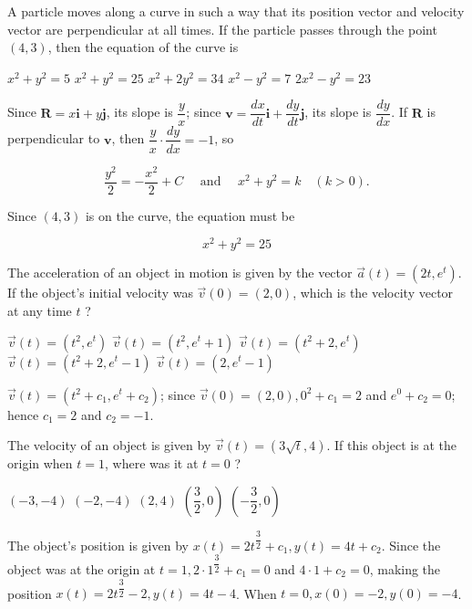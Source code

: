 \question
A particle moves along a curve in such a way that its position vector and velocity vector are perpendicular at all times. If the particle passes through the point $(4,3)$, then the equation of the curve is
\begin{choices}
  \choice $x^{2}+y^{2}=5$
  \CorrectChoice $x^{2}+y^{2}=25$
  \choice $x^{2}+2 y^{2}=34$
  \choice $x^{2}-y^{2}=7$
  \choice $2 x^{2}-y^{2}=23$
\end{choices}
\begin{solution}
Since $\mathbf{R}=x \mathbf{i}+y \mathbf{j}$, its slope is $\dfrac{y}{x}$; since $\mathbf{v}=\dfrac{d x}{d t} \mathbf{i}+\dfrac{d y}{d t} \mathbf{j}$, its slope is $\dfrac{d y}{d x}$. If $\mathbf{R}$ is perpendicular to $\mathbf{v}$, then $\dfrac{y}{x} \cdot \dfrac{d y}{d x}=-1$, so


\[
\dfrac{y^{2}}{2}=-\dfrac{x^{2}}{2}+C \quad \text { and } \quad x^{2}+y^{2}=k \quad(k>0) .
\]

Since $(4,3)$ is on the curve, the equation must be

\[
x^{2}+y^{2}=25
\]


\end{solution}

\question
The acceleration of an object in motion is given by the vector $\vec{a}(t)=\left(2 t, e^{t}\right)$. If the object's initial velocity was $\vec{v}(0)=(2,0)$, which is the velocity vector at any time $t$ ?
\begin{choices}
  \choice $\vec{v}(t)=\left(t^{2}, e^{t}\right)$
  \choice $\vec{v}(t)=\left(t^{2}, e^{t}+1\right)$
  \choice $\vec{v}(t)=\left(t^{2}+2, e^{t}\right)$
  \CorrectChoice $\vec{v}(t)=\left(t^{2}+2, e^{t}-1\right)$
  \choice $\vec{v}(t)=\left(2, e^{t}-1\right)$
\end{choices}
\begin{solution}
$\vec{v}(t)=\left(t^{2}+c_{1}, e^{t}+c_{2}\right)$; since $\vec{v}(0)=(2,0), 0^{2}+c_{1}=2$ and $e^{0}+c_{2}=0$; hence $c_{1}=2$ and $c_{2}=-1$.
\end{solution}



\newpage



\question
The velocity of an object is given by $\vec{v}(t)=(3 \sqrt{t}, 4)$. If this object is at the origin when $t=1$, where was it at $t=0$ ?
\begin{choices}
  \choice $(-3,-4)$
  \CorrectChoice $(-2,-4)$
  \choice $(2,4)$
  \choice $\left(\dfrac{3}{2}, 0\right)$
  \choice $\left(-\dfrac{3}{2}, 0\right)$
\end{choices}
\begin{solution}
The object's position is given by $x(t)=2 t^{\dfrac{3}{2}}+c_{1}, y(t)=4 t+c_{2}$. Since the object was at the origin at $t=1,2 \cdot 1^{\dfrac{3}{2}}+c_{1}=0$ and $4 \cdot 1+c_{2}=0$, making the position $x(t)=2 t^{\dfrac{3}{2}}-2, y(t)=4 t-4$. When $t=0, x(0)=-2, y(0)=-4$.
\end{solution}

